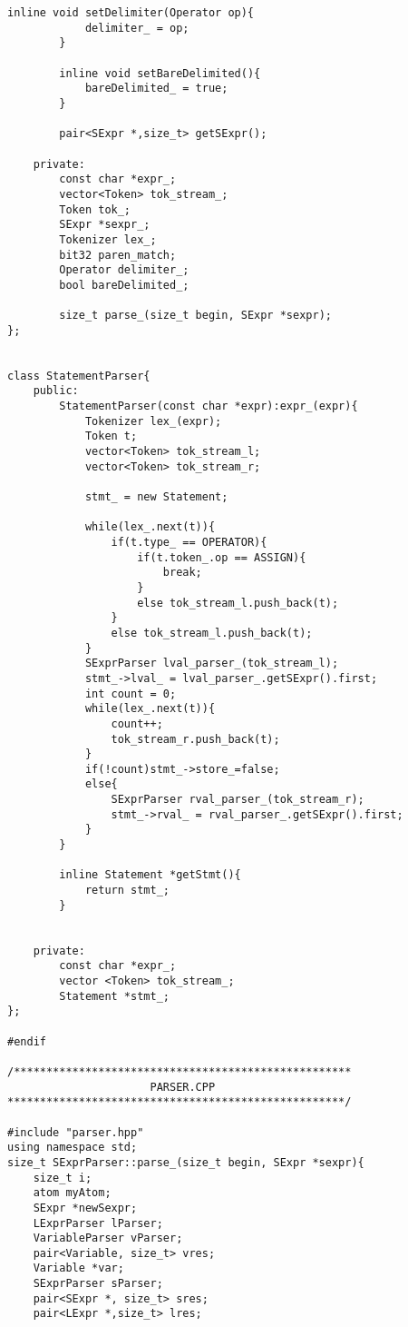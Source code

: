 \documentclass[pdftex,12pt,letterpaper,notitlepage,twoside]{article}
\begin{document}
\begin{lstlisting}[frame=single,caption={C program for testing}]
        inline void setDelimiter(Operator op){
            delimiter_ = op;
        }

        inline void setBareDelimited(){
            bareDelimited_ = true;
        }
        
        pair<SExpr *,size_t> getSExpr();
    
    private:
        const char *expr_;
        vector<Token> tok_stream_;
        Token tok_;
        SExpr *sexpr_;
        Tokenizer lex_;
        bit32 paren_match;
        Operator delimiter_;
        bool bareDelimited_; 

        size_t parse_(size_t begin, SExpr *sexpr);
};


class StatementParser{
    public:
        StatementParser(const char *expr):expr_(expr){
            Tokenizer lex_(expr);
            Token t;
            vector<Token> tok_stream_l;
            vector<Token> tok_stream_r;

            stmt_ = new Statement;

            while(lex_.next(t)){
                if(t.type_ == OPERATOR){
                    if(t.token_.op == ASSIGN){
                        break;
                    }
                    else tok_stream_l.push_back(t);
                }
                else tok_stream_l.push_back(t);
            }
            SExprParser lval_parser_(tok_stream_l);
            stmt_->lval_ = lval_parser_.getSExpr().first;
            int count = 0;
            while(lex_.next(t)){
                count++;
                tok_stream_r.push_back(t);
            }
            if(!count)stmt_->store_=false;
            else{
                SExprParser rval_parser_(tok_stream_r);
                stmt_->rval_ = rval_parser_.getSExpr().first;
            }
        }

        inline Statement *getStmt(){
            return stmt_;
        }


    private:
        const char *expr_;
        vector <Token> tok_stream_;
        Statement *stmt_;
};

#endif

/****************************************************
                      PARSER.CPP
****************************************************/

#include "parser.hpp"
using namespace std;
size_t SExprParser::parse_(size_t begin, SExpr *sexpr){
    size_t i;
    atom myAtom;
    SExpr *newSexpr;
    LExprParser lParser;
    VariableParser vParser;
    pair<Variable, size_t> vres;
    Variable *var;
    SExprParser sParser;
    pair<SExpr *, size_t> sres;
    pair<LExpr *,size_t> lres;



\end{lstlisting}
\end{document}
